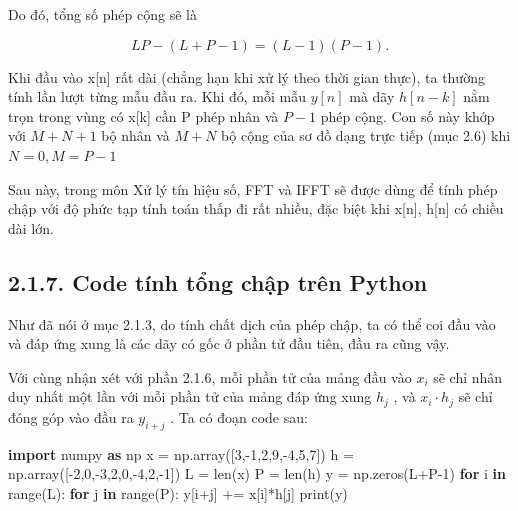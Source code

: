 \documentclass[
  10
]{article}
\newenvironment{Shaded}{}{}
\newcommand{\BuiltInTok}[1]{\textcolor[rgb]{0.00,0.50,0.00}{#1}}
\newcommand{\ControlFlowTok}[1]{\textcolor[rgb]{0.00,0.44,0.13}{\textbf{#1}}}
\newcommand{\DecValTok}[1]{\textcolor[rgb]{0.25,0.63,0.44}{#1}}
\newcommand{\ImportTok}[1]{\textcolor[rgb]{0.00,0.50,0.00}{\textbf{#1}}}
\newcommand{\KeywordTok}[1]{\textcolor[rgb]{0.00,0.44,0.13}{\textbf{#1}}}
\newcommand{\NormalTok}[1]{#1}
\newcommand{\OperatorTok}[1]{\textcolor[rgb]{0.40,0.40,0.40}{#1}}
\begin{document}
Do đó, tổng số phép cộng sẽ là

\[
L P - (L + P - 1) = (L - 1) (P - 1).
\]

Khi đầu vào x{[}n{]} rất dài (chẳng hạn khi xử lý theo thời gian thực),
ta thường tính lần lượt từng mẫu đầu ra. Khi đó, mỗi mẫu \(y [ n ]\) mà
dãy \(h [ n - k ]\) nằm trọn trong vùng có x{[}k{]} cần P phép nhân và
\(P - 1\) phép cộng. Con số này khớp với \(M + N + 1\) bộ nhân và
\(M + N\) bộ cộng của sơ đồ dạng trực tiếp (mục 2.6) khi
\(N = 0 , M = P - 1\)

Sau này, trong môn Xử lý tín hiệu số, FFT và IFFT sẽ được dùng để tính
phép chập với độ phức tạp tính toán thấp đi rất nhiều, đặc biệt khi
x{[}n{]}, h{[}n{]} có chiều dài lớn.

\subsection{2.1.7. Code tính tổng chập trên
Python}\label{code-tuxednh-tux1ed5ng-chux1eadp-truxean-python}

Như đã nói ở mục 2.1.3, do tính chất dịch của phép chập, ta có thể coi
đầu vào và đáp ứng xung là các dãy có gốc ở phần tử đầu tiên, đầu ra
cũng vậy.

Với cùng nhận xét với phần 2.1.6, mỗi phần tử của mảng đầu vào
\(x _ { i }\) sẽ chỉ nhân duy nhất một lần với mỗi phần tử của mảng đáp
ứng xung \(h _ { j }\) , và \(x _ { i } \cdot h _ { j }\) sẽ chỉ đóng
góp vào đầu ra \(y _ { i + j }\) . Ta có đoạn code sau:

\begin{Shaded}
\begin{Highlighting}[]
\ImportTok{import}\NormalTok{ numpy }\ImportTok{as}\NormalTok{ np}
\NormalTok{x }\OperatorTok{=}\NormalTok{ np.array([}\DecValTok{3}\NormalTok{,}\OperatorTok{{-}}\DecValTok{1}\NormalTok{,}\DecValTok{2}\NormalTok{,}\DecValTok{9}\NormalTok{,}\OperatorTok{{-}}\DecValTok{4}\NormalTok{,}\DecValTok{5}\NormalTok{,}\DecValTok{7}\NormalTok{])}
\NormalTok{h }\OperatorTok{=}\NormalTok{ np.array([}\OperatorTok{{-}}\DecValTok{2}\NormalTok{,}\DecValTok{0}\NormalTok{,}\OperatorTok{{-}}\DecValTok{3}\NormalTok{,}\DecValTok{2}\NormalTok{,}\DecValTok{0}\NormalTok{,}\OperatorTok{{-}}\DecValTok{4}\NormalTok{,}\DecValTok{2}\NormalTok{,}\OperatorTok{{-}}\DecValTok{1}\NormalTok{])}
\NormalTok{L }\OperatorTok{=} \BuiltInTok{len}\NormalTok{(x)}
\NormalTok{P }\OperatorTok{=} \BuiltInTok{len}\NormalTok{(h)}
\NormalTok{y }\OperatorTok{=}\NormalTok{ np.zeros(L}\OperatorTok{+}\NormalTok{P}\OperatorTok{{-}}\DecValTok{1}\NormalTok{)}
\ControlFlowTok{for}\NormalTok{ i }\KeywordTok{in} \BuiltInTok{range}\NormalTok{(L):}
    \ControlFlowTok{for}\NormalTok{ j }\KeywordTok{in} \BuiltInTok{range}\NormalTok{(P):}
\NormalTok{    y[i}\OperatorTok{+}\NormalTok{j] }\OperatorTok{+=}\NormalTok{ x[i]}\OperatorTok{*}\NormalTok{h[j]}
\BuiltInTok{print}\NormalTok{(y) }
\end{Highlighting}
\end{Shaded}
\end{document}
